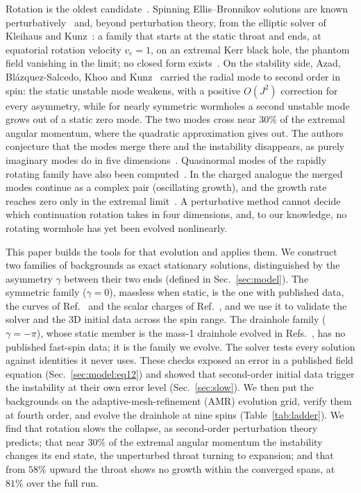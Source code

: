 \documentclass[twocolumn,floatfix,aps,prd,superscriptaddress,nofootinbib]{revtex4-2}
\begin{document}
Rotation is the oldest candidate~\cite{matos2006}. Spinning Ellis--Bronnikov solutions are known perturbatively~\cite{kashargin2008} and, beyond perturbation theory, from the elliptic solver of Kleihaus and Kunz~\cite{kleihaus_kunz2014,chew2016}: a family that starts at the static throat and ends, at equatorial rotation velocity $v_e=1$, on an extremal Kerr black hole, the phantom field vanishing in the limit; no closed form exists~\cite{volkov2021}. On the stability side, Azad, Bl\'azquez-Salcedo, Khoo and Kunz~\cite{azad2023,azad2024} carried the radial mode to second order in spin: the static unstable mode weakens, with a positive $O(J^2)$ correction for every asymmetry, while for nearly symmetric wormholes a second unstable mode grows out of a static zero mode. The two modes cross near $30\%$ of the extremal angular momentum, where the quadratic approximation gives out. The authors conjecture that the modes merge there and the instability disappears, as purely imaginary modes do in five dimensions~\cite{dzhunushaliev2013}. Quasinormal modes of the rapidly rotating family have also been computed~\cite{khoo2024}. In the charged analogue the merged modes continue as a complex pair (oscillating growth), and the growth rate reaches zero only in the extremal limit~\cite{blazquez2025}. A perturbative method cannot decide which continuation rotation takes in four dimensions, and, to our knowledge, no rotating wormhole has yet been evolved nonlinearly.

This paper builds the tools for that evolution and applies them. We construct two families of backgrounds as exact stationary solutions, distinguished by the asymmetry $\gamma$ between their two ends (defined in Sec.~\ref{sec:model}). The symmetric family ($\gamma=0$), massless when static, is the one with published data, the curves of Ref.~\cite{kleihaus_kunz2014} and the scalar charges of Ref.~\cite{chew2016}, and we use it to validate the solver and the 3D initial data across the spin range. The drainhole family ($\gamma=-\pi$), whose static member is the mass-1 drainhole evolved in Refs.~\cite{shirokov2026,shirokov2026c}, has no published fast-spin data; it is the family we evolve. The solver tests every solution against identities it never uses. These checks exposed an error in a published field equation (Sec.~\ref{sec:model:eq12}) and showed that second-order initial data trigger the instability at their own error level (Sec.~\ref{sec:slow}). We then put the backgrounds on the adaptive-mesh-refinement (AMR) evolution grid, verify them at fourth order, and evolve the drainhole at nine spins (Table~\ref{tab:ladder}). We find that rotation slows the collapse, as second-order perturbation theory predicts; that near $30\%$ of the extremal angular momentum the instability changes its end state, the unperturbed throat turning to expansion; and that from $58\%$ upward the throat shows no growth within the converged spans, at $81\%$ over the full run.
\end{document}

